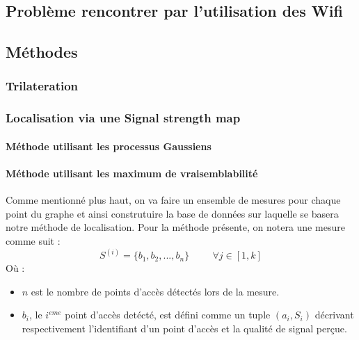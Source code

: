 \documentclass[11pt,journal,compsoc]{IEEEtran}
\begin{document}
  \subsection{Problème rencontrer par l'utilisation des Wifi}
  \subsection{Méthodes}
    \subsubsection{Trilateration}
    \subsubsection{Localisation via une Signal strength map}
      \paragraph{Méthode utilisant les processus Gaussiens}
      \paragraph{Méthode utilisant les maximum de vraisemblabilité}
        Comme mentionné plus haut, on va faire un ensemble de mesures pour chaque point du graphe et ainsi construtuire la base de données sur laquelle se basera notre méthode de localisation. Pour la méthode présente, on notera une mesure comme suit :
        \begin{equation}
          S^{(i)}=\{b_{1}, b_{2}, ..., b_{n}\} \hspace{1cm} \forall j \in [1, k]
        \end{equation}
        Où :
        \begin{itemize}
          \item $n$ est le nombre de points d'accès détectés lors de la mesure.
          \item $b_{i}$, le $i^{eme}$ point d'accès detécté, est défini comme un tuple $(a_{i}, S_{i})$ décrivant respectivement l'identifiant d'un point d'accès et la qualité de signal perçue.
        \end{itemize}
        
\end{document}
